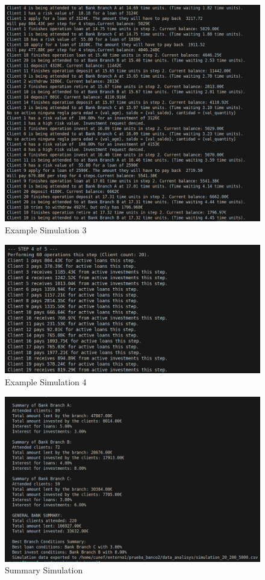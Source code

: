 \documentclass[titlepage, 12pt]{article}
\begin{document}
\begin{figure} [h]
    \centering
    \includegraphics[scale=0.4]{Screenshots/Example Simulation3.jpeg}
    \caption{Example Simulation 3}
    \label{fig:Example Simulation3}
\end{figure}

\begin{figure} [h]
    \centering
    \includegraphics[scale=0.4]{Screenshots/Example Simulation4.jpeg}
    \caption{Example Simulation 4}
    \label{fig:Example Simulation4}
\end{figure}

\begin{figure} [h]
    \centering
    \includegraphics[scale=0.4]{Screenshots/Summary Simulation.jpeg}
    \caption{Summary Simulation}
    \label{fig:Summary Simulation}
\end{figure}
\end{document}
